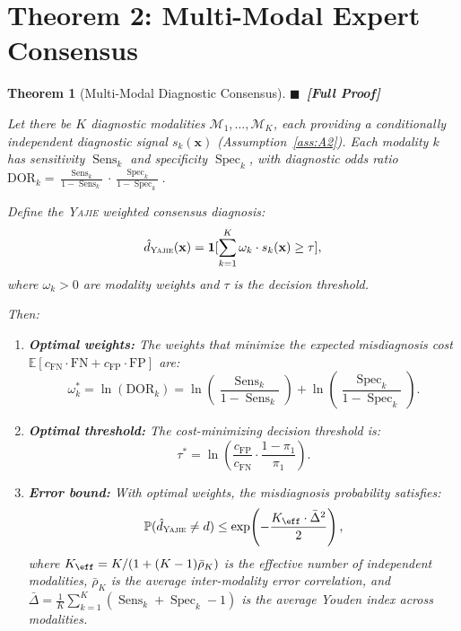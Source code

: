 \documentclass[11pt,a4paper]{article}
\newtheorem{theorem}{Theorem}[section]
\theoremstyle{definition}
\newcommand{\rigorFull}[0]{$\blacksquare$~\textbf{[Full Proof]}}
\newcommand{\Yajie}{\textsc{Yajie}}
\DeclareMathOperator{\Sens}{Sens}
\DeclareMathOperator{\Spec}{Spec}
\newcommand{\E}{\mathbb{E}}
\newcommand{\Pbb}{\mathbb{P}}
\newcommand{\ind}[1]{\mathbf{1}[#1]}
\newcommand{\disease}{d}                       %
\newcommand{\diagnosis}{\hat{d}}               %
\newcommand{\modality}{\mathcal{M}}            %
\newcommand{\falseNeg}{\text{FN}}              %
\newcommand{\falsePos}{\text{FP}}              %
\begin{document}
\section{Theorem 2: Multi-Modal Expert Consensus}
\label{sec:thm2}

\begin{theorem}[Multi-Modal Diagnostic Consensus]
\label{thm:multimodal_consensus}
\rigorFull

Let there be $K$ diagnostic modalities $\modality_1, \dots, \modality_K$, each
providing a conditionally independent diagnostic signal $s_k(\mathbf{x})$
(Assumption~\ref{ass:A2}). Each modality $k$ has sensitivity $\Sens_k$ and
specificity $\Spec_k$, with diagnostic odds ratio
$\text{DOR}_k = \frac{\Sens_k}{1-\Sens_k} \cdot \frac{\Spec_k}{1-\Spec_k}$.

Define the \Yajie{} weighted consensus diagnosis:
\begin{equation}\label{eq:yajie_modal}
    \diagnosis_{\Yajie}(\mathbf{x}) = \ind{\sum_{k=1}^{K} \omega_k \cdot s_k(\mathbf{x}) \ge \tau},
\end{equation}
where $\omega_k > 0$ are modality weights and $\tau$ is the decision threshold.

Then:

\begin{enumerate}[label=(\roman*)]
    \item \textbf{Optimal weights:} The weights that minimize the expected
    misdiagnosis cost $\E[c_{\text{FN}} \cdot \falseNeg + c_{\text{FP}} \cdot \falsePos]$ are:
    \begin{equation}\label{eq:optimal_weights}
        \omega_k^* = \ln(\text{DOR}_k) = \ln\!\left(\frac{\Sens_k}{1-\Sens_k}\right) + \ln\!\left(\frac{\Spec_k}{1-\Spec_k}\right).
    \end{equation}

    \item \textbf{Optimal threshold:} The cost-minimizing decision threshold is:
    \begin{equation}\label{eq:optimal_threshold}
        \tau^* = \ln\!\left(\frac{c_{\text{FP}}}{c_{\text{FN}}} \cdot \frac{1-\pi_1}{\pi_1}\right).
    \end{equation}

    \item \textbf{Error bound:} With optimal weights, the misdiagnosis
    probability satisfies:
    \begin{equation}\label{eq:thm2_error_bound}
        \Pbb(\diagnosis_{\Yajie} \neq \disease) \le \exp\!\left(-\frac{K_{\eff} \cdot \bar{\Delta}^2}{2}\right),
    \end{equation}
    where $K_{\eff} = K / (1 + (K-1)\bar{\rho}_K)$ is the effective number
    of independent modalities, $\bar{\rho}_K$ is the average inter-modality
    error correlation, and $\bar{\Delta} = \frac{1}{K}\sum_{k=1}^{K} (\Sens_k + \Spec_k - 1)$
    is the average Youden index across modalities.
\end{enumerate}
\end{theorem}
\end{document}
